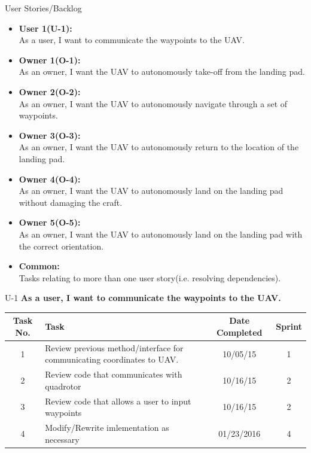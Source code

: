 \documentclass[11pt]{beamer}
\begin{document}
\begin{frame}{User Stories/Backlog}

\begin{itemize}
\item \textbf{User 1(U-1):}\\ As a user, I want to communicate the waypoints to the UAV.
\item \textbf{Owner 1(O-1):}\\ As an owner, I want the UAV to autonomously take-off from the landing pad.
\item \textbf{Owner 2(O-2):}\\ As an owner, I want the UAV to autonomously navigate through a set of waypoints.
\item \textbf{Owner 3(O-3):}\\ As an owner, I want the UAV to autonomously return to the location of the landing pad.
\item \textbf{Owner 4(O-4):}\\ As an owner, I want the UAV to autonomously land on the landing pad without damaging the craft.
\item \textbf{Owner 5(O-5):}\\ As an owner, I want the UAV to autonomously land on the landing pad with the correct orientation.
\item \textbf{Common:}\\ Tasks relating to more than one user story(i.e. resolving dependencies).
\end{itemize}

\end{frame}

\begin{frame}{U-1}
\textbf{As a user, I want to communicate the waypoints to the UAV.}
\begin{tabular}{| c | >{\raggedright}m{4cm} | c | c |}\hline
Task No. & Task & Date Completed & Sprint\\\hline
1 & Review previous method/interface for communicating coordinates to UAV. & 10/05/15 & 1 \\\hline
2 & Review code that communicates with quadrotor & 10/16/15 & 2 \\\hline
3 & Review code that allows a user to input waypoints & 10/16/15 & 2\\\hline
4 & Modify/Rewrite imlementation as necessary & 01/23/2016 & 4\\\hline

\end{tabular}
\end{frame}
\end{document}
